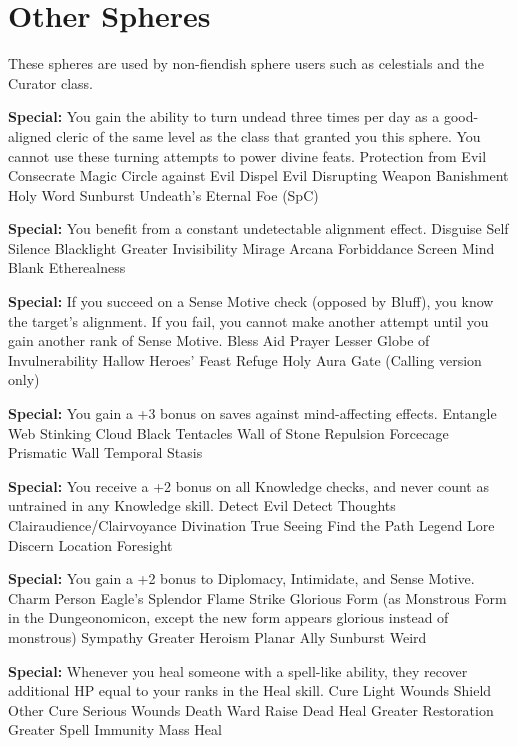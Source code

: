\section{Other Spheres}

These spheres are used by non-fiendish sphere users such as celestials and the Curator class.

\begin{multicols}{2}

\label{sphere:exorcism}
\textbf{Special: }{You gain the ability to turn undead three times per day as a good-aligned cleric of the same level as the class that granted you this sphere. You cannot use these turning attempts to power divine feats.}
\sphere
{Protection from Evil}
{Consecrate}
{Magic Circle against Evil}
{Dispel Evil}
{Disrupting Weapon}
{Banishment}
{Holy Word}
{Sunburst}
{Undeath's Eternal Foe (SpC)}

\label{sphere:mystery}
\textbf{Special: }{You benefit from a constant undetectable alignment effect.}
\sphere
{Disguise Self}
{Silence}
{Blacklight}
{Greater Invisibility}
{Mirage Arcana}
{Forbiddance}
{Screen}
{Mind Blank}
{Etherealness}


\label{sphere:piety}
\textbf{Special: }{If you succeed on a Sense Motive check (opposed by Bluff), you know the target's alignment. If you fail, you cannot make another attempt until you gain another rank of Sense Motive.}
\sphere
{Bless}
{Aid}
{Prayer}
{Lesser Globe of Invulnerability}
{Hallow}
{Heroes' Feast}
{Refuge}
{Holy Aura}
{Gate (Calling version only)}


\label{sphere:restraint}
\textbf{Special: }{You gain a +3 bonus on saves against mind-affecting effects.}
\sphere
{Entangle}
{Web}
{Stinking Cloud}
{Black Tentacles}
{Wall of Stone}
{Repulsion}
{Forcecage}
{Prismatic Wall}
{Temporal Stasis}


\label{sphere:revelation}
\textbf{Special: }{You receive a +2 bonus on all Knowledge checks, and never count as untrained in any Knowledge skill.}
\sphere
{Detect Evil}
{Detect Thoughts}
{Clairaudience/Clairvoyance}
{Divination}
{True Seeing}
{Find the Path}
{Legend Lore}
{Discern Location}
{Foresight}


\label{sphere:splendor}
\textbf{Special: }{You gain a +2 bonus to Diplomacy, Intimidate, and Sense Motive.}
\sphere
{Charm Person}
{Eagle's Splendor}
{Flame Strike}
{Glorious Form (as Monstrous Form in the Dungeonomicon, except the new form appears glorious instead of monstrous)}
{Sympathy}
{Greater Heroism}
{Planar Ally}
{Sunburst}
{Weird}


\label{sphere:vigor}
\textbf{Special: }{Whenever you heal someone with a spell-like ability, they recover additional HP equal to your ranks in the Heal skill.}
\sphere
{Cure Light Wounds}
{Shield Other}
{Cure Serious Wounds}
{Death Ward}
{Raise Dead}
{Heal}
{Greater Restoration}
{Greater Spell Immunity}
{Mass Heal}

\end{multicols}